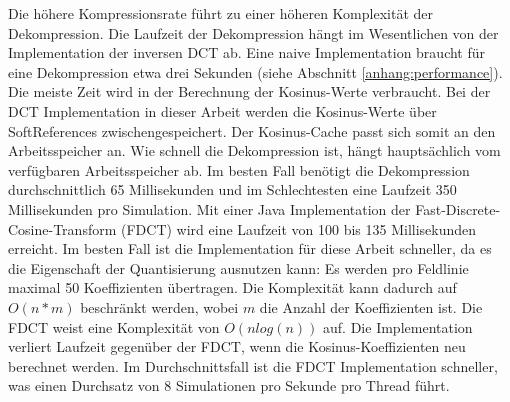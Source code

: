 Die höhere Kompressionsrate führt zu einer höheren Komplexität der Dekompression. Die Laufzeit der Dekompression hängt im Wesentlichen von der Implementation der inversen DCT ab. Eine naive Implementation braucht für eine Dekompression etwa drei Sekunden (siehe Abschnitt \ref{anhang:performance}). Die meiste Zeit wird in der Berechnung der Kosinus-Werte verbraucht. Bei der DCT Implementation in dieser Arbeit werden die Kosinus-Werte über SoftReferences zwischengespeichert. Der Kosinus-Cache passt sich somit an den Arbeitsspeicher an. Wie schnell die Dekompression ist, hängt hauptsächlich vom verfügbaren Arbeitsspeicher ab. Im besten Fall benötigt die Dekompression durchschnittlich 65 Millisekunden und im Schlechtesten eine Laufzeit 350 Millisekunden pro Simulation. Mit einer Java Implementation der Fast-Discrete-Cosine-Transform (FDCT) wird eine Laufzeit von 100 bis 135 Millisekunden erreicht. Im besten Fall ist die Implementation für diese Arbeit schneller, da es die Eigenschaft der Quantisierung ausnutzen kann: Es werden pro Feldlinie maximal 50 Koeffizienten übertragen. Die Komplexität kann dadurch auf $O(n*m)$ beschränkt werden, wobei $m$ die Anzahl der Koeffizienten ist. Die FDCT weist eine Komplexität von $O(n log(n))$ auf. Die Implementation verliert Laufzeit gegenüber der FDCT, wenn die Kosinus-Koeffizienten neu berechnet werden. Im Durchschnittsfall ist die FDCT Implementation schneller, was einen Durchsatz von 8 Simulationen pro Sekunde pro Thread führt.